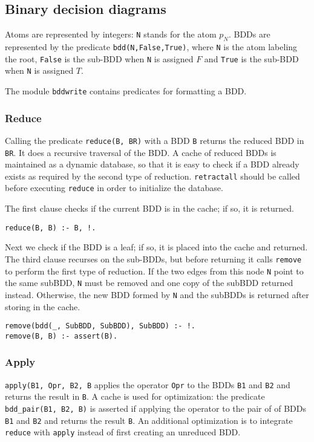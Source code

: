 \documentclass[11pt]{article}
\newcommand*{\p}[1]{\textup{\texttt{#1}}}
\begin{document}
\subsection{Binary decision diagrams}\label{s.bdd}

Atoms are represented by integers: \p{N} stands for the atom $p_{N}$.
BDDs are represented by the predicate \p{bdd(N,False,True)}, where \p{N}
is the atom labeling the root, \p{False} is the sub-BDD when \p{N} is
assigned $F$ and \p{True} is the sub-BDD when \p{N} is assigned $T$.

The module \p{bddwrite} contains predicates for formatting a BDD.

\subsubsection{Reduce}

Calling the predicate \p{reduce(B, BR)} with a BDD \p{B} returns the
reduced BDD in \p{BR}. It does a recursive traversal of the BDD. A cache
of reduced BDDs is maintained as a dynamic database, so that it is easy
to check if a BDD already exists as required by the second type of
reduction. \p{retractall} should be called before executing \p{reduce}
in order to initialize the database.

The first clause checks if the current BDD is in the cache; if so,
it is returned.

\begin{verbatim}
reduce(B, B) :- B, !.
\end{verbatim}

Next we check if the BDD is a leaf; if so, it is placed into the cache
and returned. The third clause recurses on the sub-BDDs, but before
returning it calls \p{remove} to perform the first type of reduction. If
the two edges from this node \p{N} point to the same subBDD, \p{N} must
be removed and one copy of the subBDD returned instead. Otherwise, the
new BDD formed by \p{N} and the subBDDs is returned after storing in the
cache.

\begin{verbatim}
remove(bdd(_, SubBDD, SubBDD), SubBDD) :- !.
remove(B, B) :- assert(B).
\end{verbatim}

\subsubsection{Apply}

\p{apply(B1, Opr, B2, B} applies the operator \p{Opr} to
the BDDs \p{B1} and \p{B2} and returns the result in \p{B}. A cache is
used for optimization: the predicate \p{bdd\_pair(B1, B2, B)} is
asserted if applying the operator to the pair of of BDDs \p{B1} and
\p{B2} and returns the result \p{B}. An additional optimization is to
integrate \p{reduce} with \p{apply} instead of first creating an
unreduced BDD.
\end{document}
